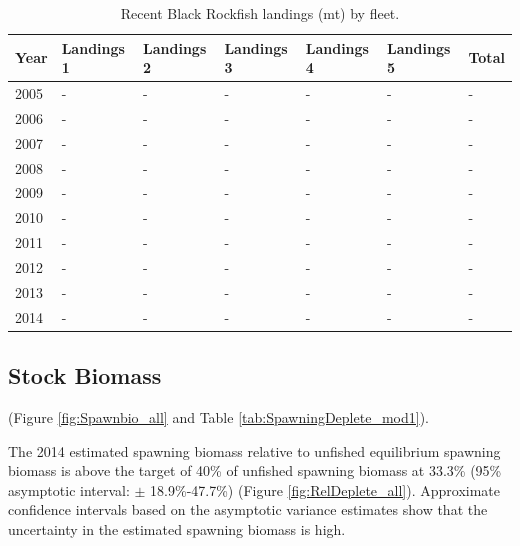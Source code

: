 \documentclass[12pt,]{article}
\begin{document}
\begin{table}[ht]
\centering
\caption{Recent Black Rockfish landings (mt) by 
                                            fleet.} 
\label{tab:Exec_catch}
\begin{tabular}{l>{\centering}p{1in}>{\centering}p{1in}>{\centering}p{1in}>{\centering}p{.9in}>{\centering}p{.9in}>{\centering}p{.6in}}
  \hline
Year & Landings 1 & Landings 2 & Landings 3 & Landings 4 & Landings 5 & Total \\ 
  \hline
2005 & - & - & - & - & - & - \\ 
  2006 & - & - & - & - & - & - \\ 
  2007 & - & - & - & - & - & - \\ 
  2008 & - & - & - & - & - & - \\ 
  2009 & - & - & - & - & - & - \\ 
  2010 & - & - & - & - & - & - \\ 
  2011 & - & - & - & - & - & - \\ 
  2012 & - & - & - & - & - & - \\ 
  2013 & - & - & - & - & - & - \\ 
  2014 & - & - & - & - & - & - \\ 
   \hline
\end{tabular}
\end{table}

\FloatBarrier

\newpage

\FloatBarrier

\subsection*{Stock Biomass}\label{stock-biomass}

(Figure \ref{fig:Spawnbio_all} and Table
\ref{tab:SpawningDeplete_mod1}).

The 2014 estimated spawning biomass relative to unfished equilibrium
spawning biomass is above the target of 40\% of unfished spawning
biomass at 33.3\% (95\% asymptotic interval: \(\pm\) 18.9\%-47.7\%)
(Figure \ref{fig:RelDeplete_all}). Approximate confidence intervals
based on the asymptotic variance estimates show that the uncertainty in
the estimated spawning biomass is high.

\FloatBarrier
\end{document}

